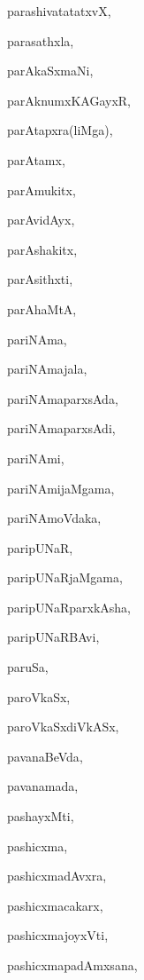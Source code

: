 \begin{multicols}{2}
{parashivatatatxvX}, \pageref{parashivatatatxvX}

{parasathxla}, \pageref{parasathxla}

{parAkaSxmaNi}, \pageref{parAkaSxmaNi}

{parAknumxKAGayxR}, \pageref{parAknumxKAGayxR}

{parAtapxra(liMga)}, \pageref{parAtapxraliMga}

{parAtamx}, \pageref{parAtamx}

{parAmukitx}, \pageref{parAmukitx}

{parAvidAyx}, \pageref{parAvidAyx}

{parAshakitx}, \pageref{parAshakitx}

{parAsithxti}, \pageref{parAsithxti}

{parAhaMtA}, \pageref{parAhaMtA}

{pariNAma}, \pageref{pariNAma}

{pariNAmajala}, \pageref{pariNAmajala}

{pariNAmaparxsAda}, \pageref{pariNAmaparxsAda}

{pariNAmaparxsAdi}, \pageref{pariNAmaparxsAdi}

{pariNAmi}, \pageref{pariNAmi}

{pariNAmijaMgama}, \pageref{pariNAmijaMgama}

{pariNAmoVdaka}, \pageref{pariNAmoVdaka}

{paripUNaR}, \pageref{paripUNaR}

{paripUNaRjaMgama}, \pageref{paripUNaRjaMgama}

{paripUNaRparxkAsha}, \pageref{paripUNaRparxkAsha}

{paripUNaRBAvi}, \pageref{paripUNaRBAvi}

{paruSa}, \pageref{paruSa}

{paroVkaSx}, \pageref{paroVkaSx}

{paroVkaSxdiVkASx}, \pageref{paroVkaSxdiVkASx}

{pavanaBeVda}, \pageref{pavanaBeVda}

{pavanamada}, \pageref{pavanamada}

{pashayxMti}, \pageref{pashayxMti}

{pashicxma}, \pageref{pashicxma}

{pashicxmadAvxra}, \pageref{pashicxmadAvxra}

{pashicxmacakarx}, \pageref{pashicxmacakarx}

{pashicxmajoyxVti}, \pageref{pashicxmajoyxVti}

{pashicxmapadAmxsana}, \pageref{pashicxmapadAmxsana}


\end{multicols}
